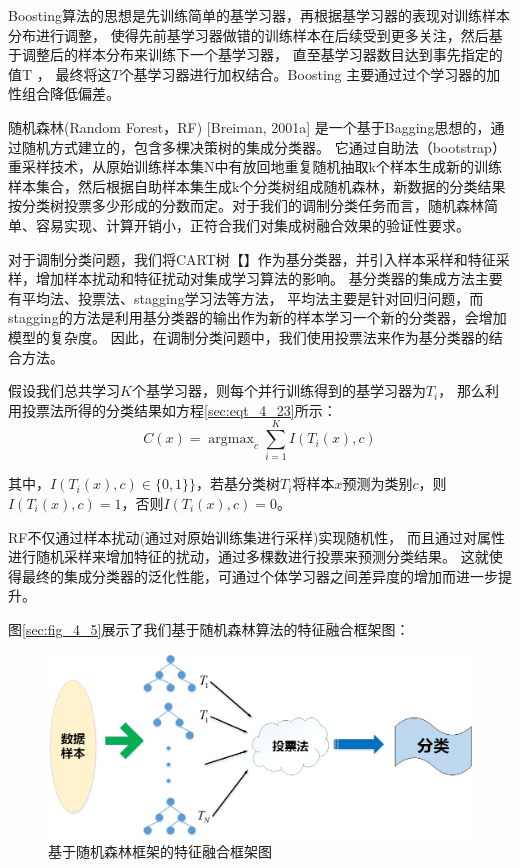 Boosting算法的思想是先训练简单的基学习器，再根据基学习器的表现对训练样本分布进行调整，
使得先前基学习器做错的训练样本在后续受到更多关注，然后基于调整后的样本分布来训练下一个基学习器，
直至基学习器数目达到事先指定的值T ， 最终将这$T$个基学习器进行加权结合。Boosting 主要通过过个学习器的加性组合降低偏差。\par

随机森林(Random Forest，RF) [Breiman, 2001a] 是一个基于Bagging思想的，通过随机方式建立的，包含多棵决策树的集成分类器。
它通过自助法（bootstrap）重采样技术，从原始训练样本集N中有放回地重复随机抽取k个样本生成新的训练样本集合，然后根据自助样本集生成k个分类树组成随机森林，新数据的分类结果按分类树投票多少形成的分数而定。对于我们的调制分类任务而言，随机森林简单、容易实现、计算开销小，正符合我们对集成树融合效果的验证性要求。\par


对于调制分类问题，我们将CART树【】作为基分类器，并引入样本采样和特征采样，增加样本扰动和特征扰动对集成学习算法的影响。
基分类器的集成方法主要有平均法、投票法、stagging学习法等方法，
平均法主要是针对回归问题，而stagging的方法是利用基分类器的输出作为新的样本学习一个新的分类器，会增加模型的复杂度。
因此，在调制分类问题中，我们使用投票法来作为基分类器的结合方法。\par

假设我们总共学习$K$个基学习器，则每个并行训练得到的基学习器为$T_{i}$，
那么利用投票法所得的分类结果如方程\ref{sec:eqt_4_23}所示：
\begin{equation}
	C(x) = \mathop{\arg\max}_{c} \sum_{i=1}^{K} I(T_i(x), c)
\end{equation}

其中，$I(T_i(x), c) \in \{0, 1\}\}$，若基分类树$T_{i}$将样本$x$预测为类别$c$，则$I(T_i(x), c)=1$，否则$I(T_i(x), c)=0$。\par
RF不仅通过样本扰动(通过对原始训练集进行采样)实现随机性，
而且通过对属性进行随机采样来增加特征的扰动，通过多棵数进行投票来预测分类结果。
这就使得最终的集成分类器的泛化性能，可通过个体学习器之间差异度的增加而进一步提升。\par
图\ref{sec:fig_4_5}展示了我们基于随机森林算法的特征融合框架图：
\begin{figure}[!h]
	\centering
	\includegraphics[scale=0.5]{figures/chapter_4/Tree_combine}
	\caption{基于随机森林框架的特征融合框架图}\label{sec:fig_4_4}
\end{figure}




